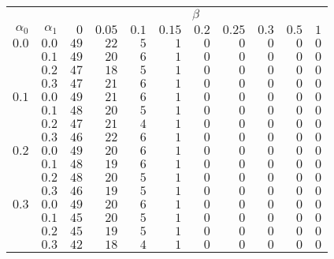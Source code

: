 \begin{tabular}{rr|rrrrrrrrr}
\hline\hline
 && \multicolumn{9}{c}{$\beta$}\\
 $\alpha_0$ & $\alpha_1$ & $0$ & $0.05$ & $0.1$ & $0.15$ & $0.2$ & $0.25$ & $0.3$ & $0.5$ & $1$ \\ 
 \hline
$0.0$ & $0.0$ & $49$ & $22$ & $5$ & $1$ & $0$ & $0$ & $0$ & $0$ & $0$\\ 
 & $0.1$ & $49$ & $20$ & $6$ & $1$ & $0$ & $0$ & $0$ & $0$ & $0$\\ 
 & $0.2$ & $47$ & $18$ & $5$ & $1$ & $0$ & $0$ & $0$ & $0$ & $0$\\ 
 & $0.3$ & $47$ & $21$ & $6$ & $1$ & $0$ & $0$ & $0$ & $0$ & $0$\\ 
\hline 
 $0.1$ & $0.0$ & $49$ & $21$ & $6$ & $1$ & $0$ & $0$ & $0$ & $0$ & $0$\\ 
 & $0.1$ & $48$ & $20$ & $5$ & $1$ & $0$ & $0$ & $0$ & $0$ & $0$\\ 
 & $0.2$ & $47$ & $21$ & $4$ & $1$ & $0$ & $0$ & $0$ & $0$ & $0$\\ 
 & $0.3$ & $46$ & $22$ & $6$ & $1$ & $0$ & $0$ & $0$ & $0$ & $0$\\ 
\hline 
 $0.2$ & $0.0$ & $49$ & $20$ & $6$ & $1$ & $0$ & $0$ & $0$ & $0$ & $0$\\ 
 & $0.1$ & $48$ & $19$ & $6$ & $1$ & $0$ & $0$ & $0$ & $0$ & $0$\\ 
 & $0.2$ & $48$ & $20$ & $5$ & $1$ & $0$ & $0$ & $0$ & $0$ & $0$\\ 
 & $0.3$ & $46$ & $19$ & $5$ & $1$ & $0$ & $0$ & $0$ & $0$ & $0$\\ 
\hline 
 $0.3$ & $0.0$ & $49$ & $20$ & $6$ & $1$ & $0$ & $0$ & $0$ & $0$ & $0$\\ 
 & $0.1$ & $45$ & $20$ & $5$ & $1$ & $0$ & $0$ & $0$ & $0$ & $0$\\ 
 & $0.2$ & $45$ & $19$ & $5$ & $1$ & $0$ & $0$ & $0$ & $0$ & $0$\\ 
 & $0.3$ & $42$ & $18$ & $4$ & $1$ & $0$ & $0$ & $0$ & $0$ & $0$\\ 
 \hline 
 \end{tabular}
